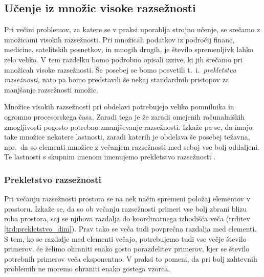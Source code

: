 \documentclass[12pt,a4paper,twoside]{article}
\theoremstyle{definition} %
\theoremstyle{plain} %
\numberwithin{equation}{section}  %
\begin{document}

\subsection{Učenje iz množic visoke razsežnosti}

Pri večini problemov, za katere se v praksi uporablja strojno učenje, se srečamo z množicami visokih razsežnosti. 
Pri množicah podatkov iz področij financ, medicine, satelitskih posnetkov, in mnogih drugih, je število spremenljivk lahko zelo veliko. 
V tem razdelku bomo podrobno opisali izzive, ki jih srečamo pri množicah visoke razsežnosti. 
Še posebej se bomo posvetili t.~i.~\emph{prekletstvu razsežnosti}, nato pa bomo predstavili še nekaj standardnih pristopov za manjšanje razsežnosti množic.

Množice visokih razsežnosti pri obdelavi potrebujejo veliko pomnilnika in ogromno procesorskega časa. 
Zaradi tega je že zaradi omejenih računalniških zmogljivosti pogosto potrebno zmanjševanje razsežnosti. 
Izkaže pa se, da imajo take množice nekatere lastnosti, zaradi katerih je obdelava še posebej težavna, 
npr.\ da so elementi množice z večanjem razsežnosti med seboj vse bolj oddaljeni. 
Te lastnosti s skupnim imenom imenujemo prekletstvo razsežnosti \cite{bellman2015adaptive}. %



\subsubsection{Prekletstvo razsežnosti}

Pri večanju razsežnosti prostora se na nek način spremeni položaj elementov v prostoru. 
Izkaže se, da so ob večanju razsežnosti primeri vse bolj zbrani blizu roba prostora, saj se njihova razdalja do koordinatnega izhodišča veča (trditev \ref{trd:prekletstvo_dim}). 
Prav tako se veča tudi povprečna razdalja med elementi. %
S tem, ko se razdalje med elementi večajo, potrebujemo tudi vse večje število primerov, če želimo ohraniti enako gosto porazdelitev primerov, kjer se število potrebnih primerov veča eksponentno. 
V praksi to pomeni, da pri bolj zahtevnih problemih ne moremo ohraniti enako gostega vzorca. 
\end{document}
